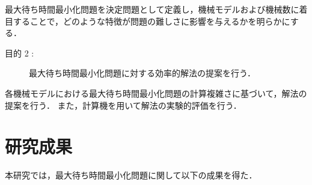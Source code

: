 \documentclass[12pt]{optlab-bachelor}
\begin{document}
最大待ち時間最小化問題を決定問題として定義し，機械モデルおよび機械数に着目することで，どのような特徴が問題の難しさに影響を与えるかを明らかにする．

\begin{description}
  \item[目的 2 :]
  最大待ち時間最小化問題に対する効率的解法の提案を行う．
\end{description}

各機械モデルにおける最大待ち時間最小化問題の計算複雑さに基づいて，解法の提案を行う．
また，計算機を用いて解法の実験的評価を行う．

\section{研究成果}
本研究では，最大待ち時間最小化問題に関して以下の成果を得た．
\end{document}
